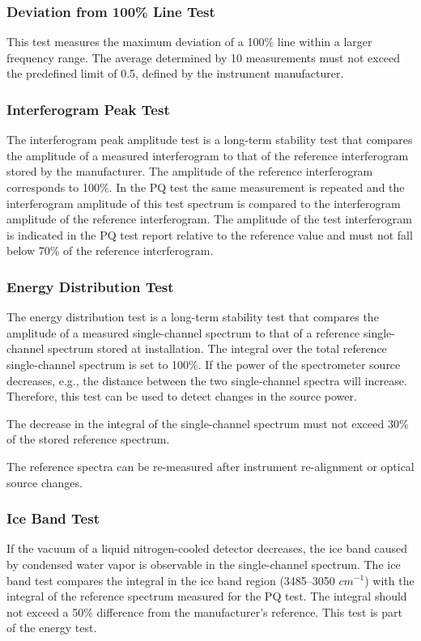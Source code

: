 \subsubsection{Deviation from 100\% Line Test}
This test measures the maximum deviation of a 100\% line within a larger frequency range. The average determined by 10 measurements must not exceed the predefined limit of 0.5, defined by the instrument manufacturer.

\subsubsection{Interferogram Peak Test}
The interferogram peak amplitude test is a long-term stability test that compares the amplitude of a measured interferogram to that of the reference interferogram stored by the manufacturer. The amplitude of the reference interferogram corresponds to 100\%. In the PQ test the same measurement is repeated and the interferogram amplitude of this test spectrum is compared to the interferogram amplitude of the reference interferogram. The amplitude of the test interferogram is indicated in the PQ test report relative to the reference value and must not fall below 70\% of the reference interferogram. 

\subsubsection{Energy Distribution Test}
\label{subsubsec:energytest}
The energy distribution test is a long-term stability test that compares the amplitude of a measured single-channel spectrum to that of a reference single-channel spectrum stored at installation. The integral over the total reference single-channel spectrum is set to 100\%. If the power of the spectrometer source decreases, e.g., the distance between the two single-channel spectra will increase. Therefore, this test can be used to detect changes in the source power.

The decrease in the integral of the single-channel spectrum must not exceed 30\% of the stored reference spectrum.

The reference spectra can be re-measured after instrument re-alignment or optical source changes.

\subsubsection{Ice Band Test}
If the vacuum of a liquid nitrogen-cooled detector decreases, the ice band caused by condensed water vapor is observable in the single-channel spectrum. The ice band test compares the integral in the ice band region (3485--3050 $cm^{-1}$) with the integral of the reference spectrum measured for the PQ test. The integral should not exceed a 50\% difference from the manufacturer's reference. This test is part of the energy test.

